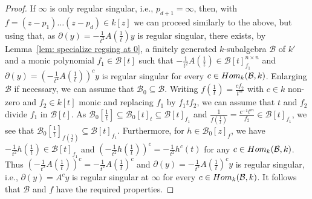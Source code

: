 \documentclass[10pt,a4paper]{amsart}
\def\l{\mathcal}
\def\del{\partial}
\def\Hom{\textup{Hom}}
\begin{document}
\begin{proof}
	 If $\infty$ is only regular singular, i.e., $p_{d+1}=\infty$, then, with $f=(z-p_1)\ldots(z-p_d)\in k[z]$ we can proceed similarly to the above, but using that, as $\del(y)=-\frac{1}{t^2}A(\frac{1}{t})y$ is regular singular, there exists, by Lemma~\ref{lem: specialize regsing at 0}, a finitely generated $k$-subalgebra $\l B$ of $k'$ and a monic polynomial $f_1\in\l B[t]$ such that $-\frac{1}{t^2}A(\frac{1}{t})\in \l B[t]_{f_1}^{n\times n}$ and $\del(y)=(-\frac{1}{t^2}A(\frac{1}{t}))^cy$ is regular singular for every $c\in\Hom_k(\l B,k)$. Enlarging $\l B$ if necessary, we can assume that $\l B_0\subseteq \l B$.  Writing $f(\frac{1}{t})=\frac{cf_2}{t^m}$ with $c\in k$ non-zero and $f_2\in k[t]$ monic and replacing $f_1$ by $f_1tf_2$, we can assume that $t$ and $f_2$ divide $f_1$ in $\l B[t]$. As $\l B_0[\frac{1}{t}]\subseteq \l B_0[t]_t\subseteq \l B[t]_{f_1}$ and $\frac{1}{f(\frac{1}{t})}=\frac{c^{-1}t^m}{f_2}\in \l B[t]_{f_1}$, we see that $\l B_0[\frac{1}{t}]_{f(\frac{1}{t})}\subseteq \l B[t]_{f_1}$. Furthermore, for $h\in\l B_0[z]_f$, we have $-\frac{1}{t^2}h(\frac{1}{t})\in\l B[t]_{f_1}$ and $\left(-\frac{1}{t^2}h(\frac{1}{t})\right)^c=-\frac{1}{t^2}h^c(t)$ for any $c\in\Hom_k(\l B,k)$. Thus $\left(-\frac{1}{t^2}A(\frac{1}{t})\right)^c=-\frac{1}{t^2}A(\frac{1}{t})^c$ and  $\del(y)=-\frac{1}{t^2}A(\frac{1}{t})^cy$ is regular singular, i.e., $\del(y)=A^cy$ is regular singular at $\infty$ for every $c\in\Hom_k(\l B,k)$. It follows that $\l B$ and $f$ have the required properties.
%	 
%	 
%	 
%	 
%	 
%	

\end{proof}
\end{document}
